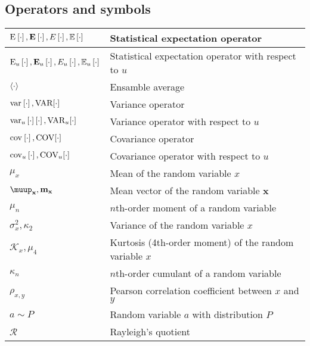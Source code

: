 \documentclass{article}
\begin{document}
\subsection{Operators and symbols}
\begin{xltabular}{\textwidth}{XX}
    \(\E{\cdot}, \nossekE{\cdot}, E\left[ \cdot \right], \mathbb{E}\left[ \cdot \right]\) & Statistical expectation operator \cite{nossekAdaptiveArraySignal2015,dinizAdaptiveFilteringAlgorithms2002}\\ \hline
    \(\E[u]{\cdot}, \nossekE[u]{\cdot},  E_u\left[ \cdot \right], \mathbb{E}_u\left[ \cdot \right]\) & Statistical expectation operator with respect to \(u\)\\ \hline
    \(\expval{\cdot}\) & Ensamble average\\ \hline
    \(\var{\cdot}, \textnormal{VAR}[\cdot]\) & Variance operator \cite{haykinAdaptiveFilterTheory2002,leon-garciaProbabilityStatisticsRandom2007,proakisDigitalCommunications2007,bishopPatternRecognitionMachine2006}\\ \hline
    \(\var[u]{\cdot} \left[ \cdot \right], \textnormal{VAR}_u[\cdot]\) & Variance operator with respect to \(u\)\\ \hline
    \(\cov{\cdot}, \textnormal{COV}[\cdot]\) & Covariance operator \cite{bishopPatternRecognitionMachine2006}\\ \hline
    \(\cov[u]{\cdot}, \textnormal{COV}_u[\cdot]\) & Covariance operator with respect to \(u\)\\ \hline
    \(\mu_x\) & Mean of the random variable \(x\) \\ \hline
    \(\boldsymbol{\muup}_\mathbf{x}, \mathbf{m}_\mathbf{x}\) & Mean vector of the random variable \(\mathbf{x}\) \cite{brownIntroductionRandomSignals1997} \\ \hline
    \(\mu_n\) & \(n\)th-order moment of a random variable \\ \hline
    \(\sigma_x^2, \kappa_2\) & Variance of the random variable \(x\)\\ \hline
    \(\mathcal{K}_x, \mu_4\) & Kurtosis (4th-order moment) of the random variable \(x\)\\ \hline
    \(\kappa_n\) & \(n\)th-order cumulant of a random variable \\ \hline
    \(\rho_{x,y}\) & Pearson correlation coefficient between \(x\) and \(y\)\\ \hline
    \(a\sim P\) & Random variable \(a\) with distribution \(P\) \\ \hline
    \(\mathcal{R}\) & Rayleigh's quotient
\end{xltabular}
\end{document}
